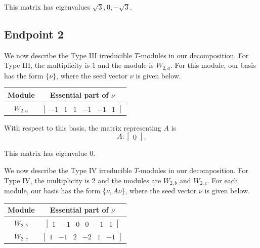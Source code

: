\documentclass[12pt,letterpaper]{article}
\newcommand{\rowvector}[1]{\begin{bmatrix} #1 \end{bmatrix}}
\begin{document}
This matrix has eigenvalues $\sqrt{3}, 0, -\sqrt{3}$.

\subsection{Endpoint 2}

We now describe the Type III irreducible $T$-modules in our decomposition. For Type III, the multiplicity is 1 and the module is  $W_{2,a}$. For this module, our basis has the form $\{\nu\}$, where the seed vector $\nu$ is given below.
\begin{center}
    \begin{tabular}{c | c}
    \toprule
       \textbf{Module}  & \textbf {Essential part of }$\nu$ \\
       \midrule
       $W_{2,a}$  & $\rowvector{-1 & 1 & 1 & -1 &-1 &1}$ \\
    \bottomrule
    \end{tabular}
\end{center}

With respect to this basis, the matrix representing $A$ is
\begin{equation}
    A: \begin{bmatrix}
  0
\end{bmatrix}.
\label{eq:pap-III}
\end{equation}

This matrix has eigenvalue $0$.

We now describe the Type IV irreducible $T$-modules in our decomposition. For Type IV, the multiplicity is 2 and the modules are $W_{2,b}$ and $W_{2,c}$. For each module, our basis has the form $\{\nu, A\nu\}$, where the seed vector $\nu$ is given below.
\begin{center}
    \begin{tabular}{c | c}
    \toprule
       \textbf{Module}  & \textbf {Essential part of }$\nu$ \\
       \midrule
       $W_{2,b}$  & $\rowvector{1 & -1 & 0 & 0& -1&1}$ \\[1.67pt]
       $W_{2,c}$  & $\rowvector{1 & -1 & 2 & -2& 1&-1}$ \\
    \bottomrule
    \end{tabular}
\end{center}
\end{document}
